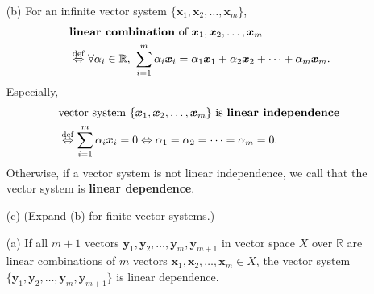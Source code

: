 \begin{frame}
  \begin{defi}
    \begin{enumerate}
      \item[(b)] For an infinite vector system $\{\boldsymbol{x}_1,\boldsymbol{x}_2,\ldots,\boldsymbol{x}_m\}$,
      \begin{align*}
        & \mbox{{\bf linear combination} of}\ \boldsymbol{x}_1,\boldsymbol{x}_2,\ldots,\boldsymbol{x}_m\\
        & \overset{\mathrm{def}}{\Leftrightarrow}\forall\alpha_i\in\mathbb R,\ \sum_{i=1}^m\alpha_i\boldsymbol{x}_i = \alpha_1\boldsymbol{x}_1+\alpha_2\boldsymbol{x}_2+\cdots+\alpha_m\boldsymbol{x}_m.
      \end{align*}
      Especially,
      \begin{align*}
        & \mbox{vector system}\ \{\boldsymbol{x}_1,\boldsymbol{x}_2,\ldots,\boldsymbol{x}_m\}\ \mbox{is {\bf linear independence}}\\
        & \overset{\mathrm{def}}{\Leftrightarrow}\sum_{i=1}^m\alpha_i\boldsymbol{x}_i = 0\Leftrightarrow\alpha_1=\alpha_2=\cdots=\alpha_m=0.
      \end{align*}
      Otherwise, if a vector system is not linear independence, we call that the vector system is {\bf linear dependence}.
    \end{enumerate}
  \end{defi}
\end{frame}

\begin{frame}
  \begin{defi}
    \begin{enumerate}
      \item[(c)] (Expand (b) for finite vector systems.)
    \end{enumerate}
  \end{defi}
\end{frame}

\begin{frame}
  \begin{proper}
    \begin{enumerate}
      \item[(a)] If all $m+1$ vectors $\boldsymbol{y}_1,\boldsymbol{y}_2,\ldots,\boldsymbol{y}_m,\boldsymbol{y}_{m+1}$ in vector space $X$ over $\mathbb{R}$
      are linear combinations of $m$ vectors $\boldsymbol{x}_1,\boldsymbol{x}_2,\ldots,\boldsymbol{x}_m\in X$,
      the vector system $\{\boldsymbol{y}_1,\boldsymbol{y}_2,\ldots,\boldsymbol{y}_m,\boldsymbol{y}_{m+1}\}$ is linear dependence.
    \end{enumerate}
  \end{proper}
\end{frame}

